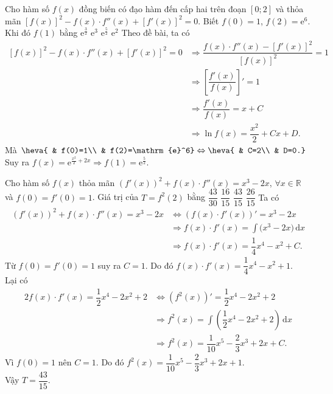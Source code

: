 \begin{ex}%
	Cho hàm số $ f(x)$ đồng biến có đạo hàm đến cấp hai trên đoạn $\left[0;2\right]$ và thỏa mãn $\left[f(x)\right]^2-f(x)\cdot f''(x)+\left[f'(x)\right]^2=0$. Biết $ f(0)=1$, $ f(2)={\mathrm{e}}^6$. Khi đó $ f(1)$ bằng
	\choice
	{$\mathrm{e}^{\tfrac{3}{2}}$}
	{$\mathrm{e}^3$}
	{\True $\mathrm{e}^{\tfrac{5}{2}}$}
	{$\mathrm{e}^2$}
	\loigiai
	{
		Theo đề bài, ta có
		\begin{align*}
			\left[f(x)\right]^2-f(x)\cdot f''(x)+\left[f'(x)\right]^2=0 &\Rightarrow\dfrac{f(x)\cdot f''(x)-\left[f'(x)\right]^2}{\left[f(x)\right]^2}=1\\
			&\Rightarrow{\left[\dfrac{f'(x)}{f(x)}\right]'}=1\\& \Rightarrow\dfrac{f'(x)}{f(x)}=x+C\\
			&\Rightarrow\ln f(x)=\dfrac{x^2}{2}+Cx+D.
		\end{align*}
		Mà $\heva{
			& f(0)=1\\ 
			& f(2)=\mathrm{e}^6} \Leftrightarrow\heva{
			& C=2\\ 
			& D=0.}$\\
		Suy ra $f(x)=\mathrm{e}^{\tfrac{x^2}{2}+2x}\Rightarrow f(1)=\mathrm{e}^{\tfrac{5}{2}}$.}
\end{ex}
\begin{ex}%
	Cho hàm số $ f(x)$ thỏa mãn $(f'(x))^2+f(x)\cdot f''(x)=x^3-2x$, $\forall x\in\mathbb{R}$ và \break $ f(0)=f'(0)=1$. Giá trị của $ T=f^2(2)$ bằng
	\choice
	{$\dfrac{43}{30}$}
	{$\dfrac{16}{15}$}
	{\True $\dfrac{43}{15}$}
	{$\dfrac{26}{15}$}
	\loigiai
	{
		Ta có
		\begin{align*}
		\left( f'(x)\right)^2+f(x)\cdot f''(x)=x^3-2x & \Leftrightarrow \left( f(x)\cdot f'(x)\right)'=x^3-2x\\& \Rightarrow f(x)\cdot f'(x)=\displaystyle\int{(x^3-2x})\mathrm{\,d} x\\&\Rightarrow f(x)\cdot f'(x)=\dfrac{1}{4}{x^4}-x^2+C.
		\end{align*}
		Từ $ f(0)=f'(0)=1$ suy ra $C=1$. Do đó $ f(x)\cdot f'(x)=\dfrac{1}{4}{x^4}-x^2+1$.\\
	Lại có
	\begin{align*}
		2f(x)\cdot f'(x)=\dfrac{1}{2}{x^4}-2x^2+2 & \Leftrightarrow \left( f^2(x)\right) '=\dfrac{1}{2}{x^4}-2x^2+2\\& \Rightarrow{f^2}(x)=\displaystyle\int{\left(\dfrac{1}{2}{x^4}-2x^2+2\right)}\mathrm{\,d} x\\& \Rightarrow{f^2}(x)=\dfrac{1}{10}{x^5}-\dfrac{2}{3}{x^3}+2x+C.
	\end{align*}
		Vì $ f(0)=1$ nên $C=1$. Do đó $f^2(x)=\dfrac{1}{10}{x^5}-\dfrac{2}{3}{x^3}+2x+1$.\\
	Vậy $T=\dfrac{43}{15}$.}
\end{ex}

